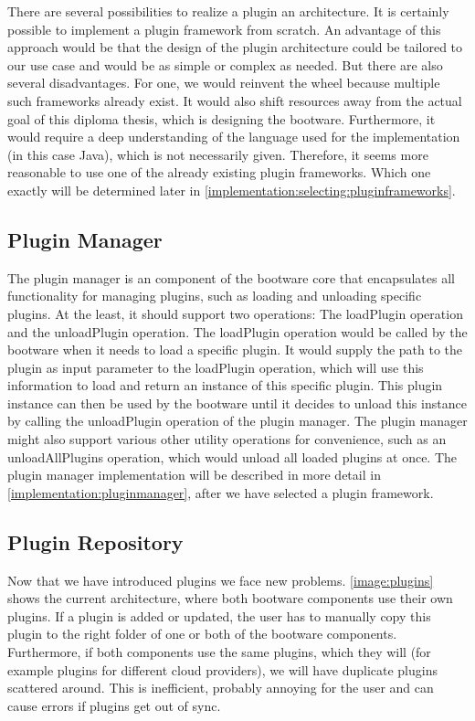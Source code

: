 There are several possibilities to realize a plugin an architecture.
It is certainly possible to implement a plugin framework from scratch.
An advantage of this approach would be that the design of the plugin architecture could be tailored to our use case and would be as simple or complex as needed.
But there are also several disadvantages.
For one, we would reinvent the wheel because multiple such frameworks already exist.
It would also shift resources away from the actual goal of this diploma thesis, which is designing the bootware.
Furthermore, it would require a deep understanding of the language used for the implementation (in this case Java), which is not necessarily given.
Therefore, it seems more reasonable to use one of the already existing plugin frameworks.
Which one exactly will be determined later in \autoref{implementation:selecting:pluginframeworks}.

\subsection{Plugin Manager}
\label{design:pluginmanager}

The plugin manager is an component of the bootware core that encapsulates all functionality for managing plugins, such as loading and unloading specific plugins.
At the least, it should support two operations: The loadPlugin operation and the unloadPlugin operation.
The loadPlugin operation would be called by the bootware when it needs to load a specific plugin.
It would supply the path to the plugin as input parameter to the loadPlugin operation, which will use this information to load and return an instance of this specific plugin.
This plugin instance can then be used by the bootware until it decides to unload this instance by calling the unloadPlugin operation of the plugin manager.
The plugin manager might also support various other utility operations for convenience, such as an unloadAllPlugins operation, which would unload all loaded plugins at once.
The plugin manager implementation will be described in more detail in \autoref{implementation:pluginmanager}, after we have selected a plugin framework.

\subsection{Plugin Repository}
\label{design:pluginrepository}

Now that we have introduced plugins we face new problems.
\autoref{image:plugins} shows the current architecture, where both bootware components use their own plugins.
If a plugin is added or updated, the user has to manually copy this plugin to the right folder of one or both of the bootware components.
Furthermore, if both components use the same plugins, which they will (for example plugins for different cloud providers), we will have duplicate plugins scattered around.
This is inefficient, probably annoying for the user and can cause errors if plugins get out of sync.

